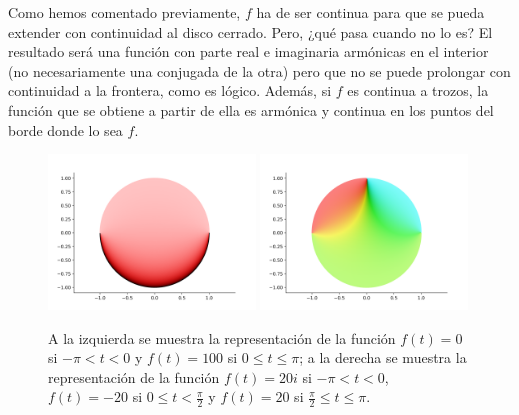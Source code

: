 Como hemos comentado previamente, $f$ ha de ser continua para que se pueda extender con continuidad al disco cerrado. Pero, ¿qué pasa cuando no lo es? El resultado será una función con parte real e imaginaria armónicas en el interior (no necesariamente una conjugada de la otra) pero que no se puede prolongar con continuidad a la frontera, como es lógico. Además, si $f$ es continua a trozos, la función que se obtiene a partir de ella es armónica y continua en los puntos del borde donde lo sea $f$. \\

\begin{figure}[!htbp]
    \centering
    \includegraphics[width=0.49\textwidth]{../Aplicacion/atrozos.png}
    \hfil
    \includegraphics[width=0.49\textwidth]{../Aplicacion/atrozos(2).png}
\caption{A la izquierda se muestra la representación de la función $f(t) = 0$ si $- \pi < t < 0$ y $f(t) = 100$ si $0 \leq t \leq \pi$; a la derecha se muestra la representación de la función $f(t) = 20i$ si $- \pi < t < 0$, $f(t) = -20$ si $0 \leq t < \frac{\pi}{2}$ y $f(t) = 20$ si $\frac{\pi}{2} \leq t \leq \pi$.}
    \label{fig:atrozos}
\end{figure}
